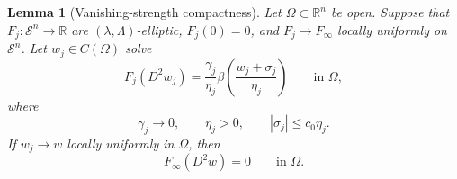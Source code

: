 \documentclass[11pt,letterpaper]{amsart}
\numberwithin{equation}{section}
\newcommand{\Sn}{\mathcal S^n}
\newtheorem{lemma}[theorem]{Lemma}
\theoremstyle{definition}
\theoremstyle{remark}
\begin{document}
\begin{lemma}[Vanishing-strength compactness]\label{lem:compactness}
Let $\Omega\subset\mathbb R^n$ be open. Suppose that $F_j:\Sn\to\mathbb R$
are $(\lambda,\Lambda)$-elliptic, $F_j(0)=0$, and
$F_j\to F_\infty$ locally uniformly on $\Sn$. Let $w_j\in C(\Omega)$ solve
\begin{equation}\label{eq:vanishing-strength-sequence}
F_j(D^2w_j)
=
\frac{\gamma_j}{\eta_j}
\beta\left(\frac{w_j+\sigma_j}{\eta_j}\right)
\qquad\text{in }\Omega,
\end{equation}
where
$$
\gamma_j\longrightarrow0,
\qquad
\eta_j>0,
\qquad
|\sigma_j|\leq c_0\eta_j.
$$
If $w_j\to w$ locally uniformly in $\Omega$, then
\begin{equation}\label{eq:homogeneous-limit}
F_\infty(D^2w)=0
\qquad\text{in }\Omega.
\end{equation}
\end{lemma}
\end{document}
